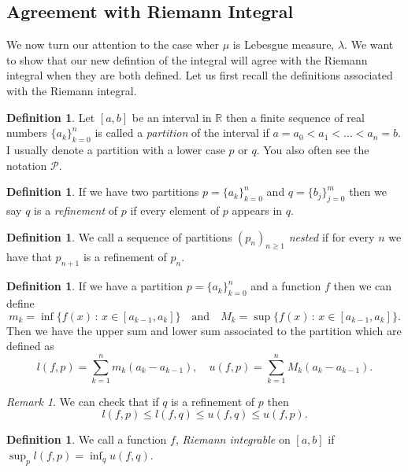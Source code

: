 \documentclass[11pt]{article}
\theoremstyle{definition}
\newtheorem{dfn}[thm]{Definition}
\theoremstyle{remark}
\newtheorem{remark}[thm]{Remark}
\begin{document}
\subsection{Agreement with Riemann Integral}
We now turn our attention to the case wher $\mu$ is Lebesgue measure, $\lambda$. We want to show that our new defintion of the integral will agree with the Riemann integral when they are both defined.  Let us first recall the definitions associated with the Riemann integral.

\begin{dfn}
Let $[a,b]$ be an interval in $\mathbb{R}$ then a finite sequence of real numbers $\{a_k\}_{k=0}^n$ is called a \emph{partition} of the interval if $a=a_0 < a_1 < \dots<a_n=b$. I usually denote a partition with a lower case $p$ or $q$. You also often see the notation $\mathscr{P}$.
\end{dfn}

\begin{dfn}
If we have two partitions $p = \{a_k\}_{k=0}^n$ and $q=\{b_j\}_{j=0}^m$ then we say $q$ is a \emph{refinement} of $p$ if every element of $p$ appears in $q$.
\end{dfn}

\begin{dfn}
We call a sequence of partitions $(p_n)_{n \geq 1}$ \emph{nested} if for every $n$ we have that $p_{n+1}$ is a refinement of $p_n$.
\end{dfn}

\begin{dfn}
If we have a partition $p = \{a_k\}_{k=0}^n$ and a function $f$ then we can define 
\[ m_k = \inf \{ f(x) \,:\, x \in [a_{k-1},a_k] \} \quad \mbox{and}\quad M_k = \sup\{ f(x)\,:\, x \in [a_{k-1},a_k]\}. \] Then we have the upper sum and lower sum associated to the partition which are defined as
\[ l(f,p) = \sum_{k=1}^n m_k(a_k-a_{k-1}), \quad u(f,p) = \sum_{k=1}^n M_k (a_k-a_{k-1}). \]
\end{dfn}
\begin{remark}
We can check that if $q$ is a refinement of $p$ then
\[ l(f,p) \leq l(f,q) \leq u(f,q) \leq u(f,p). \]
\end{remark}
\begin{dfn}
We call a function $f$, \emph{Riemann integrable} on $[a,b]$ if $\sup_p l(f,p) = \inf_q u(f,q)$.
\end{dfn}
\end{document}
